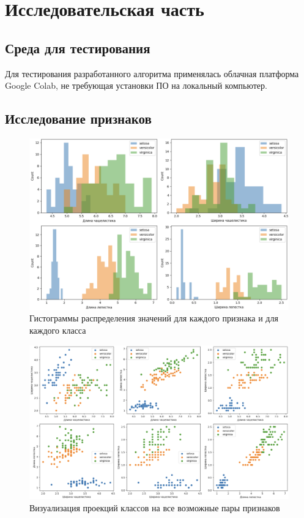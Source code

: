 \chapter{Исследовательская часть}

\section{Среда для тестирования}

Для тестирования разработанного алгоритма применялась облачная платформа Google Colab, не требующая установки ПО на локальный компьютер.

\section{Исследование признаков}

\begin{figure}
	\begin{center}
		\includegraphics[width=\textwidth]{images/1.png}
	\end{center}
	\caption{Гистограммы распределения значений для каждого признака и для каждого класса}
	\label{img:1}
\end{figure}

\begin{figure}
	\begin{center}
		\includegraphics[width=\textwidth]{images/2.png}
	\end{center}
	\caption{Визуализация проекций классов на все возможные пары признаков}
	\label{img:2}
\end{figure}

